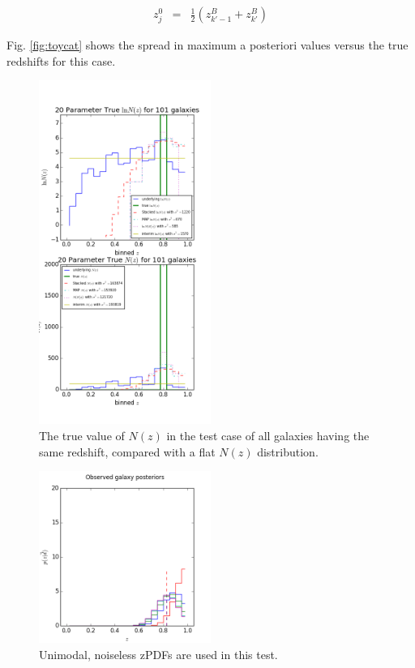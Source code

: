 \documentclass[preprint]{aastex}
\begin{document}
\begin{eqnarray}
\label{eq:fakez}
z^{0}_{j} &=& \frac{1}{2}(z_{k'-1}^{B}+z_{k'}^{B})
\end{eqnarray}

Fig. \ref{fig:toycat} shows the spread in maximum a posteriori values versus 
the true redshifts for this case.

\begin{figure}
\includegraphics[width=0.5\textwidth]{toy/trueNz.png}
\caption{The true value of $N(z)$ in the test case of all galaxies having the 
same redshift, compared with a flat $N(z)$ distribution.}
\label{fig:deltatrueNz}
\end{figure}

\begin{figure}
\includegraphics[width=0.5\textwidth]{toy/samplepzs.png}
\caption{Unimodal, noiseless zPDFs are used in this test.}
\label{fig:toypzs}
\end{figure}
\end{document}
